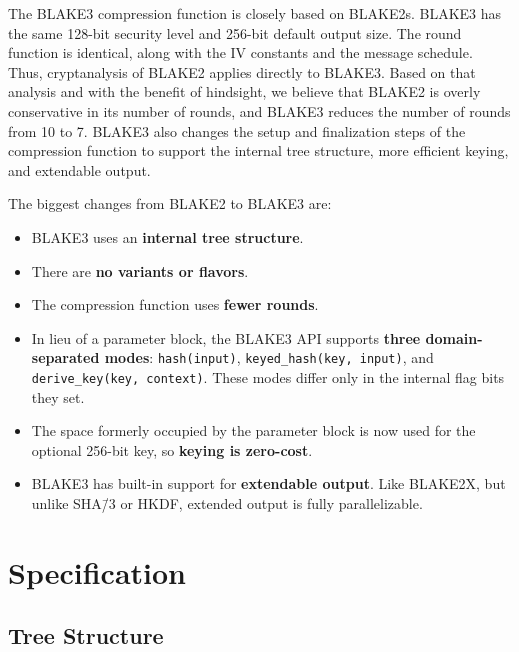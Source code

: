 \documentclass[11pt,notitlepage,a4paper]{article}
\begin{document}
The BLAKE3 compression function is closely based on BLAKE2s. BLAKE3 has the
same 128-bit security level and 256-bit default output size. The round function
is identical, along with the IV constants and the message schedule. Thus,
cryptanalysis of BLAKE2 applies directly to BLAKE3. Based on that analysis and
with the benefit of hindsight, we believe that BLAKE2 is overly conservative in
its number of rounds, and BLAKE3 reduces the number of rounds from 10 to 7.
BLAKE3 also changes the setup and finalization steps of the compression
function to support the internal tree structure, more efficient keying, and
extendable output.

The biggest changes from BLAKE2 to BLAKE3 are:

\begin{itemize}
    \item BLAKE3 uses an \textbf{internal tree structure}.
    \item There are \textbf{no variants or flavors}.
    \item The compression function uses \textbf{fewer rounds}.
    \item In lieu of a parameter block, the BLAKE3 API supports \textbf{three
        domain-separated modes}: \texttt{hash(input)},
        \texttt{keyed\_hash(key, input)}, and \texttt{derive\_key(key,
        context)}. These modes differ only in the internal flag bits they set.
    \item The space formerly occupied by the parameter block is now used for
        the optional 256-bit key, so \textbf{keying is zero-cost}.
    \item BLAKE3 has built-in support for \textbf{extendable output}. Like
        BLAKE2X, but unlike SHA\=/3 or HKDF, extended output is fully
        parallelizable.
\end{itemize}

\section{Specification}\label{sec:specification}

\subsection{Tree Structure}\label{sec:tree}
\end{document}
